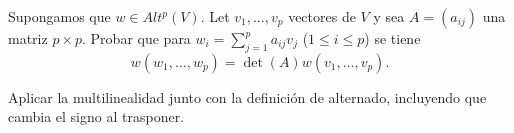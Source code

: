 \documentclass[twoside]{article}
\begin{document}
\newpage

\begin{ejercicio}{6}
Supongamos que $w\in Alt^p(V)$. Let $v_1,\dots, v_p$ vectores de $V$ y sea $A=(a_{ij})$ una matriz $p\times p$. Probar que para $w_i=\sum_{j=1}^pa_{ij}v_j$ ($1\leq i\leq p$) se tiene
$$w(w_1,\dots, w_p)=\det(A)w(v_1,\dots, v_p).$$
\end{ejercicio}
\begin{solucion}
Aplicar la multilinealidad junto con la definición de alternado, incluyendo que cambia el signo al trasponer.
\end{solucion}

\newpage
\end{document}
